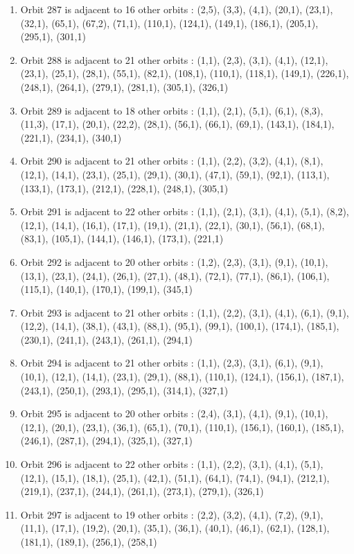 \documentclass[12pt]{article}
\begin{document}
\begin{enumerate}
\item Orbit 287 is adjacent to 16 other orbits : (2,5), (3,3), (4,1), (20,1), (23,1), (32,1), (65,1), (67,2), (71,1), (110,1), (124,1), (149,1), (186,1), (205,1), (295,1), (301,1)
\item Orbit 288 is adjacent to 21 other orbits : (1,1), (2,3), (3,1), (4,1), (12,1), (23,1), (25,1), (28,1), (55,1), (82,1), (108,1), (110,1), (118,1), (149,1), (226,1), (248,1), (264,1), (279,1), (281,1), (305,1), (326,1)
\item Orbit 289 is adjacent to 18 other orbits : (1,1), (2,1), (5,1), (6,1), (8,3), (11,3), (17,1), (20,1), (22,2), (28,1), (56,1), (66,1), (69,1), (143,1), (184,1), (221,1), (234,1), (340,1)
\item Orbit 290 is adjacent to 21 other orbits : (1,1), (2,2), (3,2), (4,1), (8,1), (12,1), (14,1), (23,1), (25,1), (29,1), (30,1), (47,1), (59,1), (92,1), (113,1), (133,1), (173,1), (212,1), (228,1), (248,1), (305,1)
\item Orbit 291 is adjacent to 22 other orbits : (1,1), (2,1), (3,1), (4,1), (5,1), (8,2), (12,1), (14,1), (16,1), (17,1), (19,1), (21,1), (22,1), (30,1), (56,1), (68,1), (83,1), (105,1), (144,1), (146,1), (173,1), (221,1)
\item Orbit 292 is adjacent to 20 other orbits : (1,2), (2,3), (3,1), (9,1), (10,1), (13,1), (23,1), (24,1), (26,1), (27,1), (48,1), (72,1), (77,1), (86,1), (106,1), (115,1), (140,1), (170,1), (199,1), (345,1)
\item Orbit 293 is adjacent to 21 other orbits : (1,1), (2,2), (3,1), (4,1), (6,1), (9,1), (12,2), (14,1), (38,1), (43,1), (88,1), (95,1), (99,1), (100,1), (174,1), (185,1), (230,1), (241,1), (243,1), (261,1), (294,1)
\item Orbit 294 is adjacent to 21 other orbits : (1,1), (2,3), (3,1), (6,1), (9,1), (10,1), (12,1), (14,1), (23,1), (29,1), (88,1), (110,1), (124,1), (156,1), (187,1), (243,1), (250,1), (293,1), (295,1), (314,1), (327,1)
\item Orbit 295 is adjacent to 20 other orbits : (2,4), (3,1), (4,1), (9,1), (10,1), (12,1), (20,1), (23,1), (36,1), (65,1), (70,1), (110,1), (156,1), (160,1), (185,1), (246,1), (287,1), (294,1), (325,1), (327,1)
\item Orbit 296 is adjacent to 22 other orbits : (1,1), (2,2), (3,1), (4,1), (5,1), (12,1), (15,1), (18,1), (25,1), (42,1), (51,1), (64,1), (74,1), (94,1), (212,1), (219,1), (237,1), (244,1), (261,1), (273,1), (279,1), (326,1)
\item Orbit 297 is adjacent to 19 other orbits : (2,2), (3,2), (4,1), (7,2), (9,1), (11,1), (17,1), (19,2), (20,1), (35,1), (36,1), (40,1), (46,1), (62,1), (128,1), (181,1), (189,1), (256,1), (258,1)

\end{enumerate}
\end{document}

